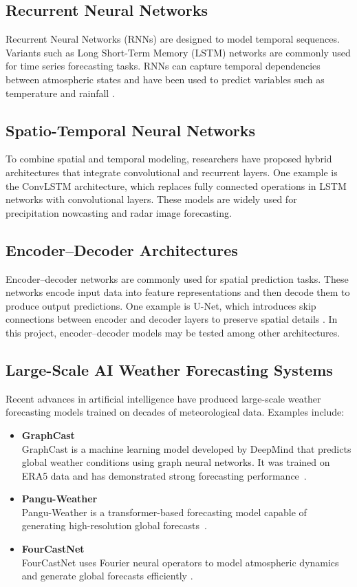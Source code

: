 \subsection{Recurrent Neural Networks}
Recurrent Neural Networks (RNNs) are designed to model temporal sequences.
Variants such as Long Short-Term Memory (LSTM) networks are commonly used for time series forecasting tasks.
RNNs can capture temporal dependencies between atmospheric states and have been used to predict variables such as temperature and rainfall \cite{RNNexemple}.
\subsection{Spatio-Temporal Neural Networks}
To combine spatial and temporal modeling, researchers have proposed hybrid architectures that integrate convolutional and recurrent layers.
One example is the ConvLSTM \cite{ConvolutionalLSTMNetwork} architecture, which replaces fully connected operations in LSTM networks with convolutional layers.
These models are widely used for precipitation nowcasting and radar image forecasting.
\subsection{Encoder–Decoder Architectures}
Encoder–decoder networks are commonly used for spatial prediction tasks.
These networks encode input data into feature representations and then decode them to produce output predictions.
One example is U-Net, which introduces skip connections between encoder and decoder layers to preserve spatial details \cite{UNETexemple}.
In this project, encoder–decoder models may be tested among other architectures.
\subsection{Large-Scale AI Weather Forecasting Systems}
Recent advances in artificial intelligence have produced large-scale weather forecasting models trained on decades of meteorological data. Examples include:

\begin{itemize}
	\item \textbf{GraphCast} \\
	GraphCast is a machine learning model developed by DeepMind that predicts global weather conditions using graph neural networks. It was trained on ERA5 data and has demonstrated strong forecasting performance~\cite{GraphCast}.
	
	\item \textbf{Pangu-Weather} \\
	Pangu-Weather is a transformer-based forecasting model capable of generating high-resolution global forecasts~\cite{Pangu-Weather}.
	
	\item \textbf{FourCastNet} \\
	FourCastNet uses Fourier neural operators to model atmospheric dynamics and generate global forecasts efficiently \cite{FourCastNet}.
\end{itemize}